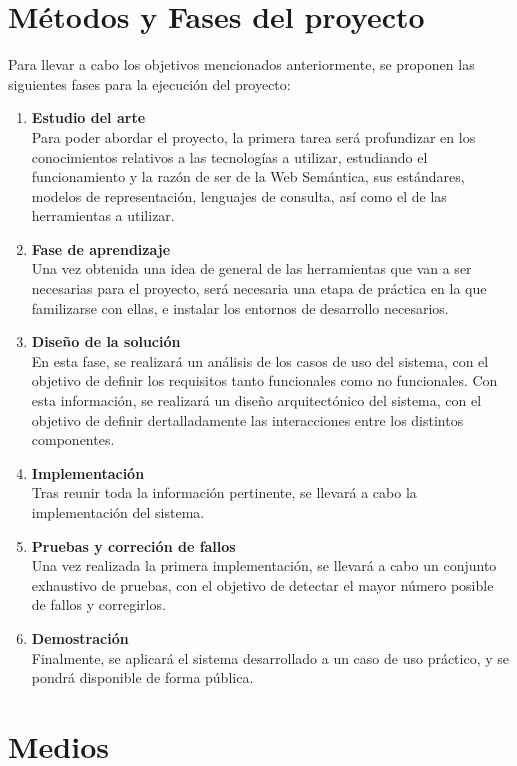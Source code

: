 \documentclass[a4paper,11pt]{report}
\begin{document}
\chapter*{Métodos y Fases del proyecto}

Para llevar a cabo los objetivos mencionados anteriormente, se proponen las siguientes fases para la ejecución del proyecto:
\begin{enumerate}
  \item \textbf{Estudio del arte } ~\\
  Para poder abordar el proyecto, la primera tarea será profundizar en los conocimientos relativos a las tecnologías a utilizar, estudiando el funcionamiento y la razón de ser de la Web Semántica, sus estándares, modelos de representación, lenguajes de consulta, así como el de las herramientas a utilizar.
  \item \textbf{Fase de aprendizaje} ~\\
  Una vez obtenida una idea de general de las herramientas que van a ser necesarias para el proyecto, será necesaria una etapa de práctica en la que familizarse con ellas, e instalar los entornos de desarrollo necesarios.
  \item \textbf{Diseño de la solución} ~\\ 
  En esta fase, se realizará un análisis de los casos de uso del sistema, con el objetivo de definir los requisitos tanto funcionales como no funcionales. Con esta información, se realizará un diseño arquitectónico del sistema, con el objetivo de definir dertalladamente las interacciones entre los distintos componentes.
  \item \textbf{Implementación} ~\\
  Tras reunir toda la información pertinente, se llevará a cabo la implementación del sistema.
  \item \textbf{Pruebas y correción de fallos} ~\\
  Una vez realizada la primera implementación, se llevará a cabo un conjunto exhaustivo de pruebas, con el objetivo de detectar el mayor número posible de fallos y corregirlos.
  \item \textbf{Demostración } ~\\
  Finalmente, se aplicará el sistema desarrollado a un caso de uso práctico, y se pondrá disponible de forma pública.
\end{enumerate}

\chapter*{Medios}
\end{document}
